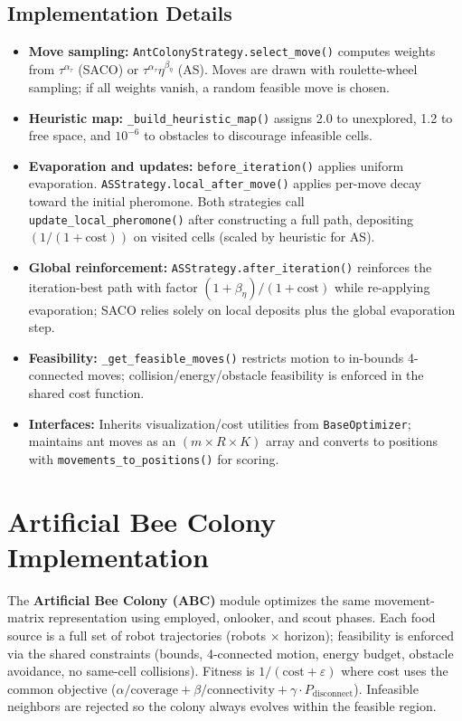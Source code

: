 \subsection{Implementation Details}
\begin{itemize}
    \item \textbf{Move sampling:} \texttt{AntColonyStrategy.select\_move()} computes weights from $\tau^{\alpha_{\tau}}$ (SACO) or $\tau^{\alpha_{\tau}}\eta^{\beta_{\eta}}$ (AS). Moves are drawn with roulette-wheel sampling; if all weights vanish, a random feasible move is chosen.
    \item \textbf{Heuristic map:} \texttt{\_build\_heuristic\_map()} assigns 2.0 to unexplored, 1.2 to free space, and $10^{-6}$ to obstacles to discourage infeasible cells.
    \item \textbf{Evaporation and updates:} \texttt{before\_iteration()} applies uniform evaporation. \texttt{ASStrategy.local\_after\_move()} applies per-move decay toward the initial pheromone. Both strategies call \texttt{update\_local\_pheromone()} after constructing a full path, depositing $(1/(1+\text{cost}))$ on visited cells (scaled by heuristic for AS).
    \item \textbf{Global reinforcement:} \texttt{ASStrategy.after\_iteration()} reinforces the iteration-best path with factor $(1+\beta_{\eta})/(1+\text{cost})$ while re-applying evaporation; SACO relies solely on local deposits plus the global evaporation step.
    \item \textbf{Feasibility:} \texttt{\_get\_feasible\_moves()} restricts motion to in-bounds 4-connected moves; collision/energy/obstacle feasibility is enforced in the shared cost function.
    \item \textbf{Interfaces:} Inherits visualization/cost utilities from \texttt{BaseOptimizer}; maintains ant moves as an $(m \times R \times K)$ array and converts to positions with \texttt{movements\_to\_positions()} for scoring.
\end{itemize}

\section{Artificial Bee Colony Implementation}

The \textbf{Artificial Bee Colony (ABC)} module optimizes the same movement-matrix representation using employed, onlooker, and scout phases. Each food source is a full set of robot trajectories (robots $\times$ horizon); feasibility is enforced via the shared constraints (bounds, 4-connected motion, energy budget, obstacle avoidance, no same-cell collisions). Fitness is $1/(\text{cost}+\varepsilon)$ where cost uses the common objective ($\alpha/\text{coverage} + \beta/\text{connectivity} + \gamma \cdot P_{\text{disconnect}}$). Infeasible neighbors are rejected so the colony always evolves within the feasible region.

